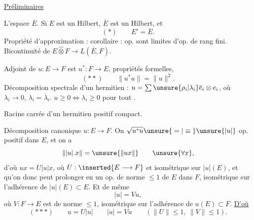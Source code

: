 
 \uline{Préliminaires}

L'espace $\overline E$. Si $E$ est un Hilbert, $\overline E$ est un Hilbert, et
\[
(*)\qquad \boxed{E'=\overline E}.
\]
Propriété d'approximation : corollaire : op.  sont limites d'op. de rang fini. Bicontinuité de $E\widehat\otimes F\longrightarrow L(\overline E,F)$.

Adjoint de $u:E\longrightarrow F$ est $u^*:F\longrightarrow E$, propriétés formelles, 
\[
(**)\qquad \boxed{\|u^*u\|=\|u\|^2}.
\]
Décomposition spectrale d'un hermitien  : $u=\sum\unsure{\rho_i|\lambda_i}\overline e_i\otimes e_i$, où $\lambda_i\longrightarrow0$, $\lambda_i=\overline\lambda_i$.  $u\geq0\Longleftrightarrow\lambda_i\geq0$ pour tout .

Racine carrée d'un  hermitien positif compact.

Décomposition canonique   $u:E\longrightarrow F$.
On   $\sqrt{u^*u}\unsure{{}={}|{}\equiv{}}\unsure{|u|}$ op. positif dans $E$, et on a
\[
\||u|.x\|=\unsure{\|ux\|}\qquad\unsure{\forall x},
\]
d'où $ux=U|u|x$, où $U:\inserted{E\longrightarrow F}$  et isométrique sur $|u|(E)$, et qu'on donc peut prolonger en un op. de norme $\leq1$ de $E$ dans $F$, isométrique sur  l'adhérence de  $|u|(E)\subset E$. Et de même
\[
|u|=Vu,
\]
où $V:F\longrightarrow E$ est de norme $\leq1$, isométrique sur l'adhérence de $u(E)\subset F$. \uline{D'où}
\[
(***)\qquad\boxed{u=U|u|\qquad |u|=Vu}\qquad(\|U\|\leq1,\ \|V\|\leq1).
\]


